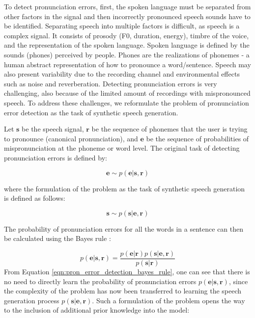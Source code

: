 \documentclass[]{interact}
\theoremstyle{plain}%
\theoremstyle{definition}
\theoremstyle{remark}
\begin{document}
To detect pronunciation errors, first, the spoken language must be separated from other factors in the signal and then incorrectly pronounced speech sounds have to be identified. Separating speech into multiple factors is difficult, as speech is a complex signal. It consists of prosody (F0, duration, energy), timbre of the voice, and the representation of the spoken language. Spoken language is defined by the sounds (phones) perceived by people. Phones are the realizations of phonemes - a human abstract representation of how to pronounce a word/sentence. Speech may also present variability due to the recording channel and environmental effects such as noise and reverberation. Detecting pronunciation errors is very challenging, also because of the limited amount of recordings with mispronounced speech. To address these challenges, we reformulate the problem of pronunciation error detection as the task of synthetic speech generation.

Let $\mathbf{s}$ be the speech signal, $\mathbf{r}$ be the sequence of phonemes that the user is trying to pronounce (canonical pronunciation), and $\mathbf{e}$ be the sequence of probabilities of mispronunciation at the phoneme or word level. The original task of detecting pronunciation errors is defined by:

\begin{equation}
 \mathbf{e} \sim p(\mathbf{e}|\mathbf{s},\mathbf{r})
\end{equation}

where the formulation of the problem as the task of synthetic speech generation is defined as follows:


\begin{equation}
 \mathbf{s} \sim p(\mathbf{s}|\mathbf{e},\mathbf{r})
\end{equation} 

The probability of pronunciation errors for all the words in a sentence can then be calculated using the Bayes rule \cite{bishop2006pattern}:

\begin{equation}
p(\mathbf{e}|\mathbf{s},\mathbf{r}) = \frac{p(\mathbf{e}|\mathbf{r})p(\mathbf{s}|\mathbf{e},\mathbf{r})}{p(\mathbf{s}|\mathbf{r})}
\label{eqn:pron_error_detection_bayes_rule}
\end{equation} From Equation \ref{eqn:pron_error_detection_bayes_rule}, one can see that there is no need to directly learn the probability of pronunciation errors $p(\mathbf{e}|\mathbf{s},\mathbf{r})$, since the complexity of the problem has now been transferred to learning the speech generation process $p(\mathbf{s}|\mathbf{e}, \mathbf{r})$. Such a formulation of the problem opens the way to the inclusion of additional prior knowledge into the model:
\end{document}
